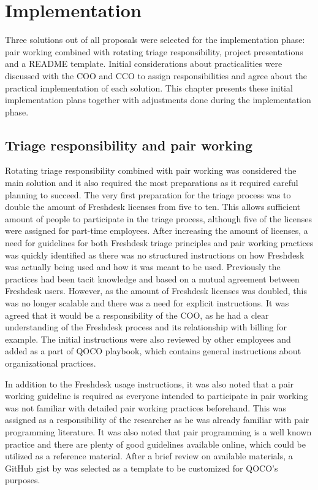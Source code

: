 \chapter{Implementation}
\label{chapter:implementation}

Three solutions out of all proposals were selected for the implementation phase: pair working combined with rotating triage responsibility, project presentations
and a README template. Initial considerations about practicalities were discussed with the COO and CCO to assign responsibilities and agree about the practical
implementation of each solution.
This chapter presents these initial implementation plans together with adjustments done during the implementation phase.

\section{Triage responsibility and pair working}

Rotating triage responsibility combined with pair working was considered the main solution and it also required the most preparations as it required careful planning to succeed.
The very first preparation for the triage process was to double the amount of Freshdesk licenses from five to ten. This allows sufficient amount of people to participate
in the triage process, although five of the licenses were assigned for part-time employees. After increasing the amount of licenses, a need for guidelines for both Freshdesk
triage principles and pair working practices was quickly identified as there was no structured instructions on how Freshdesk was
actually being used and how it was meant to be used. Previously the practices had been tacit knowledge and based on a mutual agreement between Freshdesk users. However, as the
amount of Freshdesk licenses was doubled, this was no longer scalable and there was a need for explicit instructions. It was agreed that it would be a
responsibility of the COO, as he had a clear understanding of the Freshdesk process and its relationship with billing for example. The initial instructions were also reviewed
by other employees and added as a part of QOCO playbook, which contains general instructions about organizational practices.

In addition to the Freshdesk usage instructions, it was also noted that a pair working guideline is required as everyone intended to participate in pair working
was not familiar with detailed pair working practices beforehand. This was assigned as a responsibility of the researcher as he was already familiar with pair
programming literature. It was also noted that pair programming is a well known practice and there are plenty of good guidelines available online, which could be 
utilized as a reference material. After a brief review on available materials, a GitHub gist by \citet{Sarrafieh2017} was selected as a template to be
customized for QOCO's purposes.

